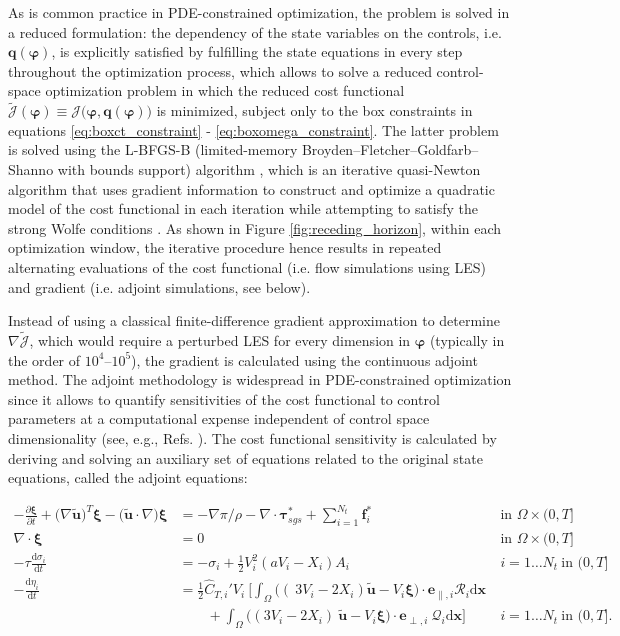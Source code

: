\documentclass[energies,article,submit,moreauthors,latex,10pt,a4paper]{mdpi}
\newcommand{\revision}[1]{{\color{red} #1}}
\newcommand{\bs}[1]{\boldsymbol{#1}}
\newcommand{\dx}{\text{d}\boldsymbol{x}}
\newcommand{\ddt}[1]{\frac{\text{d} #1}{\text{d} t}}
\newcommand{\sint}{\int_{\Omega}}
\newcommand{\utilde}{\widetilde{\bs{u}}}
\newcommand{\ctihat}{\widehat{C}_{T,i}'}
\newcommand{\R}{\mathscr{R}}
\newcommand{\J}{\mathscr{J}}
\newcommand{\eperpi}{\bs{e}_{\perp,i}}
\begin{document}
As is common practice in PDE-constrained optimization, the problem is solved in a reduced formulation: the dependency of the state variables on the controls, i.e. $\bs{q}(\bs{\varphi})$, is explicitly satisfied by fulfilling the state equations in every step throughout the optimization process, which allows to solve a reduced control-space optimization problem in which the reduced cost functional $\tilde{\J}(\bs{\varphi}) \equiv \J \big(\bs{\varphi},\bs{q}(\bs{\varphi}) \big)$ is minimized, subject only to the box constraints in equations \eqref{eq:boxct_constraint} - \eqref{eq:boxomega_constraint}. The latter problem is solved using the \revision{L-BFGS-B (limited-memory Broyden--Fletcher--Goldfarb--Shanno with bounds support) algorithm \cite{byrd1995limited}}, which is an iterative quasi-Newton algorithm that uses gradient information to construct and optimize a quadratic model of the cost functional in each iteration while attempting to satisfy the strong Wolfe conditions \cite{wolfe1969convergence}. As shown in Figure \ref{fig:receding_horizon}, within each optimization window, the iterative procedure hence results in repeated alternating evaluations of the cost functional (i.e. flow simulations using LES) and gradient (i.e. adjoint simulations, see below).

Instead of using a classical finite-difference gradient approximation to determine $\nabla \tilde{\J}$, which would require a perturbed LES for every dimension in $\bs{\varphi}$ (typically in the order of $10^4$--$10^5$), the gradient is calculated using the continuous adjoint method. The adjoint methodology is widespread in PDE-constrained optimization since it allows to quantify sensitivities of the cost functional to control parameters at a computational expense independent of control space dimensionality (see, e.g., Refs. \cite{jameson1988aerodynamic,giles2000introduction,troltzsch,borzinschulz}). The cost functional sensitivity is calculated by deriving and solving an auxiliary set of equations related to the original state equations, called the adjoint equations:
 
{\small
\begin{align}
- \frac{\partial \bs{\xi}}{\partial t} + \big( \nabla \utilde \big)^T \bs{\xi} - \big( \utilde \cdot \nabla \big) \bs{\xi} &= - \nabla \pi / \rho - \nabla \cdot \boldsymbol{\tau}^*_{sgs} + \sum_{i=1}^{N_t} \bs{f}_i^* & \text{in } \Omega \times (0,T] \label{eq:adjoint_momentum}\\
\nabla \cdot \bs{\xi} &= 0 & \text{in } \Omega \times (0,T]\label{eq:adjoint_continuity}\\
-\tau \ddt{\sigma_i} &= -\sigma_i + \frac{1}{2} V_i^2  (a V_i - X_i) A_i  &  i=1\dots N_t~\text{in } (0,T] \label{eq:adjoint_sigma}\\
- \ddt{\eta_i} &= \frac{1}{2} \ctihat V_i ~ \Bigg[ \int_{\Omega} \bigg((~3 V_i - 2 X_i ) \utilde - V_i \bs{\xi} 
\bigg) \cdot \bs{e}_{\parallel,i} \R_i \dx ~ \nonumber \\
& \qquad + \sint \bigg( (3 V_i - 2 X_i )~\utilde - V_i \bs{\xi} \bigg) \cdot \eperpi ~ \mathscr{Q}_i  \dx \Bigg] &  i=1\dots N_t~\text{in } (0,T] \label{eq:adjoint_eta}.
\end{align}
}
\end{document}
